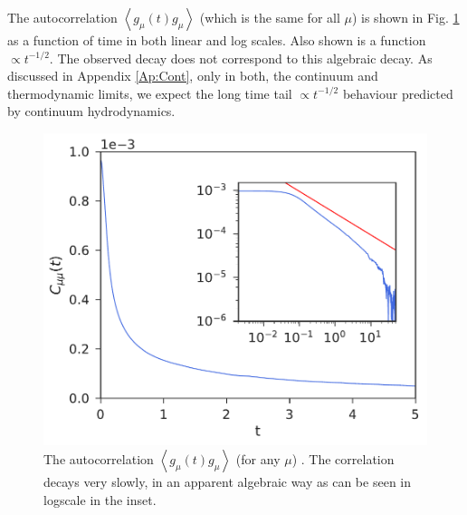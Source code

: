 \documentclass[a4paper,openright,12pt]{book}
\newcommand{\llangle}{\left\langle}
\newcommand{\rrangle}{\right\rangle}
\begin{document}
The autocorrelation $\llangle  g_{\mu}(t) g_\mu\rrangle$ (which is
the same for  all $\mu$) is shown in  Fig.  \ref{fig:Autocorrelation-PBC}
as a function of time in both  linear and log scales.  Also shown is a
function $\propto  t^{-1/2}$.  The observed decay  does not correspond
to this algebraic decay.  As discussed in Appendix \ref{Ap:Cont}, only
in both,  the continuum and  thermodynamic limits, we expect  the long
time  tail   $\propto  t^{-1/2}$  behaviour  predicted   by  continuum
hydrodynamics.

\begin{figure}[h!]
\centering
\includegraphics[scale=0.45]{Ct-mu30nu30-PBC}
\caption[Autocorrelation for PBC system.]{The autocorrelation
  $\llangle g_{\mu}(t) g_\mu\rrangle$ (for  any $\mu$)
  . The correlation  decays very
slowly, in an  apparent algebraic way as can be  seen in logscale in the inset.}
  \label{fig:Autocorrelation-PBC}
\end{figure}
\end{document}
